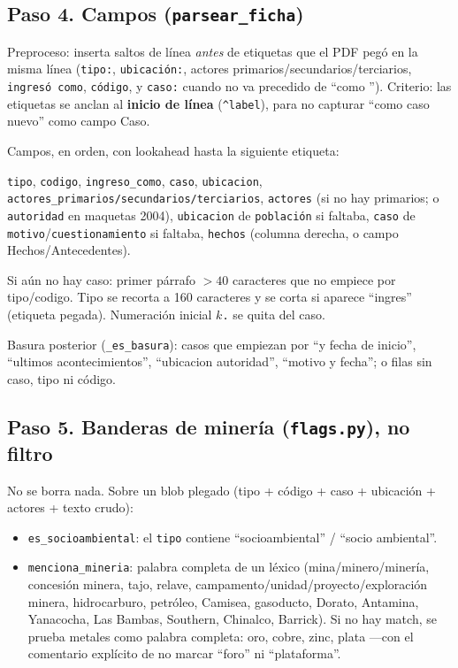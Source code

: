 \documentclass[11pt,a4paper]{article}
\begin{document}
\subsection{Paso 4. Campos (\texttt{parsear\_ficha})}

Preproceso: inserta saltos de línea \emph{antes} de etiquetas que el PDF pegó en la misma línea (\texttt{tipo:}, \texttt{ubicación:}, actores primarios/secundarios/terciarios, \texttt{ingresó como}, \texttt{código}, y \texttt{caso:} cuando no va precedido de ``como ''). Criterio: las etiquetas se anclan al \textbf{inicio de línea} (\texttt{\^{}label}), para no capturar ``como caso nuevo'' como campo Caso.

Campos, en orden, con lookahead hasta la siguiente etiqueta:

\texttt{tipo}, \texttt{codigo}, \texttt{ingreso\_como}, \texttt{caso}, \texttt{ubicacion}, \texttt{actores\_primarios/secundarios/terciarios}, \texttt{actores} (si no hay primarios; o \texttt{autoridad} en maquetas 2004), \texttt{ubicacion} de \texttt{población} si faltaba, \texttt{caso} de \texttt{motivo}/\texttt{cuestionamiento} si faltaba, \texttt{hechos} (columna derecha, o campo Hechos/Antecedentes).

Si aún no hay caso: primer párrafo $>40$ caracteres que no empiece por tipo/codigo. Tipo se recorta a 160 caracteres y se corta si aparece ``ingres'' (etiqueta pegada). Numeración inicial \texttt{$k$.} se quita del caso.

Basura posterior (\texttt{\_es\_basura}): casos que empiezan por ``y fecha de inicio'', ``ultimos acontecimientos'', ``ubicacion autoridad'', ``motivo y fecha''; o filas sin caso, tipo ni código.

\subsection{Paso 5. Banderas de minería (\texttt{flags.py}), no filtro}

No se borra nada. Sobre un blob plegado (tipo + código + caso + ubicación + actores + texto crudo):

\begin{itemize}
  \item \texttt{es\_socioambiental}: el \texttt{tipo} contiene ``socioambiental'' / ``socio ambiental''.
  \item \texttt{menciona\_mineria}: palabra completa de un léxico (mina/minero/minería, concesión minera, tajo, relave, campamento/unidad/proyecto/exploración minera, hidrocarburo, petróleo, Camisea, gasoducto, Dorato, Antamina, Yanacocha, Las Bambas, Southern, Chinalco, Barrick). Si no hay match, se prueba metales como palabra completa: oro, cobre, zinc, plata ---con el comentario explícito de no marcar ``foro'' ni ``plataforma''.
\end{itemize}
\end{document}
